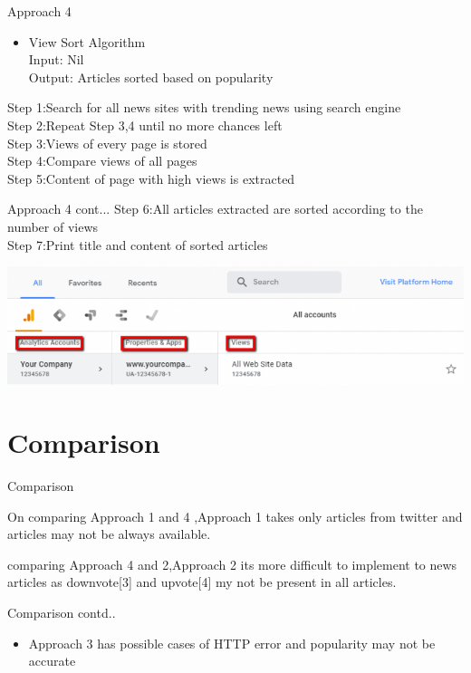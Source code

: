 \documentclass{beamer}
\begin{document}
	\begin{frame}{Approach 4}
		   \begin{itemize}
        	\item \Large View Sort Algorithm\\
        	\footnotesize
        	\Large{Input: Nil\\
        	Output: Articles sorted based on popularity \\  }
   	   \end{itemize}	
           \Large{ Step 1:Search for all news sites with trending news using search engine\\
            Step 2:Repeat Step 3,4 until no more chances left\\
            Step 3:Views of every page is stored\\
            Step 4:Compare views of all pages\\
            Step 5:Content of page with high views is extracted\\
            }


	\end{frame}
	\begin{frame}{Approach 4 cont...}
	    \Large{
            Step 6:All articles extracted are sorted according to the number of views\\
            Step 7:Print title and content of sorted articles\\} 
        
            \includegraphics[scale=.38]{google.png}
	\end{frame}
	\section{Comparison}
	\begin{frame}{Comparison}
	\begin{itemize}
            \item \Large{On comparing Approach 1 and 4 ,Approach 1 takes only articles from twitter and articles may not be always available.      
            \item comparing Approach 4 and 2,Approach 2 its more difficult to implement to news articles as downvote[3] and upvote[4] my not be present in all articles.}
  	    \end{itemize}
  	 \end{frame}
    \begin{frame}{Comparison contd..}
        \begin{itemize}
            \item \Large {Approach 3 has  possible cases of HTTP error and popularity may not be accurate}
        \end{itemize}
	\end{frame}
\end{document}
